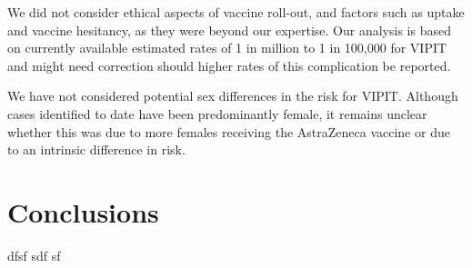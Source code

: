 \documentclass[]{interact}
\theoremstyle{plain}%
\theoremstyle{definition}
\theoremstyle{remark}
\begin{document}
We did not consider ethical aspects of vaccine roll-out, and factors
such as uptake and vaccine hesitancy, as they were beyond our expertise.
Our analysis is based on currently available estimated rates of 1 in
million to 1 in 100,000 for VIPIT and might need correction should
higher rates of this complication be reported.

We have not considered potential sex differences in the risk for VIPIT.
Although cases identified to date have been predominantly female, it
remains unclear whether this was due to more females receiving the
AstraZeneca vaccine or due to an intrinsic difference in risk.

\hypertarget{conclusions}{%
\section{Conclusions}\label{conclusions}}

dfsf sdf sf



\end{document}
